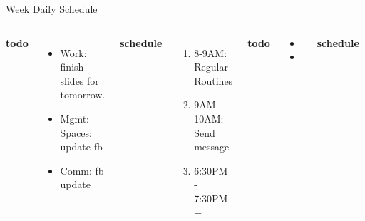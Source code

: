 \documentclass[serif, mathserif, final]{beamer}
\newcommand{\te}[1]{\textit{TimeEst:}\textit{#1}}
\begin{document}
\begin{frame}
\begin{columns}
\begin{column}{0.5\linewidth}
\begin{block}{Week Daily Schedule}
\begin{columns}
          \textbf{\small todo} \\
          \begin{itemize}
           \tiny \item \tiny Work: finish slides for tomorrow. 
           \item \tiny Mgmt: Spaces: update fb 
         \item \tiny Comm: fb update 
          \end{itemize}
          \textbf{\small schedule} \\
          \begin{enumerate}
            \tiny \item \tiny 8-9AM: Regular Routines 
          \item \tiny 9AM - 10AM: Send message 
            \item \tiny 6:30PM - 7:30PM = 
          \end{enumerate} 
          \textbf{\small todo}\\
          \begin{itemize}  
            \tiny \item \tiny 
          \item \tiny 
          \end{itemize} 

          \textbf{\small schedule}\\
          \begin{enumerate} 
            \tiny \item \tiny 8-9AM = Regular Routines 
            \item \tiny 12-1PM = gather notes about job org. during
              session 
            \item \tiny 3:30PM - 4:30PM = meeting 
            \item \tiny 6PM - 9PM = revise emot. int. chapter and
              structure wl-cheat based on it 
          \end{enumerate}  
          
          \textbf{\small todo}\\ 
          \begin{itemize}
          \item \tiny Work: code review. 
          \item \tiny Work: finish work. 
          \item \tiny Mgmt:Spaces: Haircut \te{10 minutes}. 
          \item \tiny Comm: check messages 
          \end{itemize}
          \textbf{\small schedule}\\
          \begin{enumerate}
            \tiny \item \tiny 8-9AM: Regular Routines 
          \end{enumerate}
          

\end{columns}
\end{block}
\end{column}
\end{columns}
\end{frame}
\end{document}
